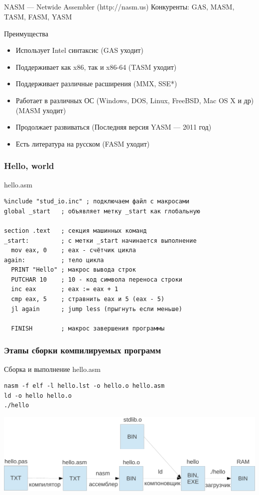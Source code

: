 \documentclass{beamer}
\begin{document}
    \subsection{}
    \begin{frame}{NASM --- Netwide Assembler (http://nasm.us)}
    Конкуренты: GAS, MASM, TASM, FASM, YASM
        \begin{block}{Преимущества}
            \begin{itemize}
                \item Использует Intel синтаксис (GAS уходит)
                \item Поддерживает как x86, так и x86-64 (TASM уходит)
                \item Поддерживает различные расширения (MMX, SSE*)
                \item Работает в различных ОС (Windows, DOS, Linux, FreeBSD, Mac OS X и др) (MASM уходит)
                \item Продолжает развиваться (Последняя версия YASM --- 2011 год)
                \item Есть литература на русском (FASM уходит) 
            \end{itemize}
        \end{block}
    \end{frame}
    \begin{frame}[fragile]
        \frametitle{Hello, world}
        \begin{block}{hello.asm}
        \begin{verbatim}
%include "stud_io.inc" ; подключаем файл с макросами
global _start   ; объявляет метку _start как глобальную

section .text   ; секция машинных команд
_start:         ; с метки _start начинается выполнение
  mov eax, 0    ; eax - счётчик цикла
again:          ; тело цикла
  PRINT "Hello" ; макрос вывода строк
  PUTCHAR 10    ; 10 - код символа переноса строки
  inc eax       ; eax := eax + 1
  cmp eax, 5    ; стравнить eax и 5 (eax - 5)
  jl again      ; jump less (прыгнуть если меньше)

  FINISH        ; макрос завершения программы
        \end{verbatim}
        \end{block}
\end{frame}
    \begin{frame}[fragile]
        \frametitle{Этапы сборки компилируемых программ}
        \begin{block}{Сборка и выполнение hello.asm}
        \begin{verbatim}
nasm -f elf -l hello.lst -o hello.o hello.asm
ld -o hello hello.o
./hello
        \end{verbatim}
        \end{block}
\includegraphics[width=\linewidth]{fig/build.pdf}
\end{frame}
\end{document}
